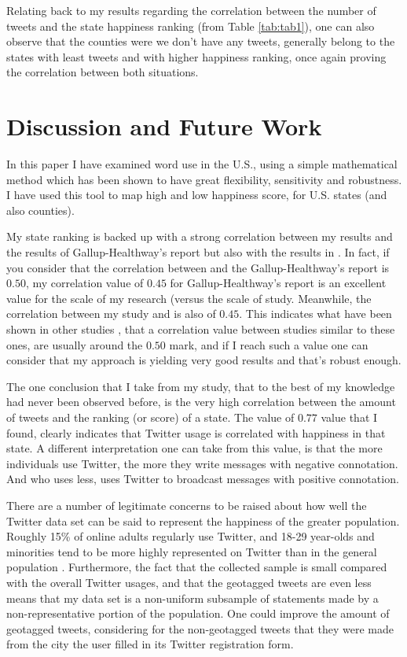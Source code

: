 \documentclass{llncs}
\begin{document}
Relating back to my results regarding the correlation between the number of tweets and the state happiness ranking (from Table \ref{tab:tab1}), one can also observe that the counties were we don't have any tweets, generally belong to the states with least tweets and with higher happiness ranking, once again proving the correlation between both situations.


\FloatBarrier
\section{Discussion and Future Work}
\label{sec:conc}

In this paper I have examined word use in the U.S., using a simple mathematical method which has been shown to have great flexibility, sensitivity and robustness. I have used this tool to map high and low happiness score, for U.S. states (and also counties).

My state ranking is backed up with a strong correlation between my results and the results of Gallup-Healthway's report but also with the results in \cite{Mitchell2013}. In fact, if you consider that the correlation between \cite{Mitchell2013} and the Gallup-Healthway's report is $0.50$, my correlation value of $0.45$ for Gallup-Healthway's report is an excellent value for the scale of my research (versus the scale of \cite{Mitchell2013} study. Meanwhile, the correlation between my study and \cite{Mitchell2013} is also of $0.45$. This indicates what have been shown in other studies \cite{Dodds2011}, that a correlation value between studies similar to these ones, are usually around the $0.50$ mark, and if I reach such a value one can consider that my approach is yielding very good results and that's robust enough.

The one conclusion that I take from my study, that to the best of my knowledge had never been observed before, is the very high correlation between the amount of tweets and the ranking (or score) of a state. The value of $0.77$ value that I found, clearly indicates that Twitter usage is correlated with happiness in that state. A different interpretation one can take from this value, is that the more individuals use Twitter, the more they write messages with negative connotation. And who uses less, uses Twitter to broadcast messages with positive connotation.

There are a number of legitimate concerns to be raised about how well the Twitter data set can be said to represent the happiness of the greater population. Roughly 15\% of online adults regularly use Twitter, and 18-29 year-olds and minorities tend to be more highly represented on Twitter than in the general population \cite{Smith2012}. Furthermore, the fact that the collected sample is small compared with the overall Twitter usages, and that the geotagged tweets are even less means that my data set is a non-uniform subsample of statements made by a non-representative portion of the population. One could improve the amount of geotagged tweets, considering for the non-geotagged tweets that they were made from the city the user filled in its Twitter registration form.
\end{document}
